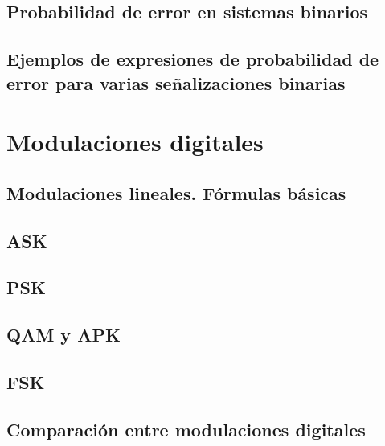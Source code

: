 \documentclass[a4paper]{book}
\begin{document}
\section{Probabilidad de error en sistemas binarios}
\section[\texorpdfstring{Ejemplos de expresiones de probabilidad de error para varias\\ señalizaciones binarias}{Ejemplos de expresiones de probabilidad de error para varias señalizaciones binarias}]{Ejemplos de expresiones de probabilidad de error para varias señalizaciones binarias}

\chapter{Modulaciones digitales}
\section{Modulaciones lineales. Fórmulas básicas}
\section{ASK}
\section{PSK}
\section{QAM y APK}
\section{FSK}
\section{Comparación entre modulaciones digitales}


%
\end{document}
